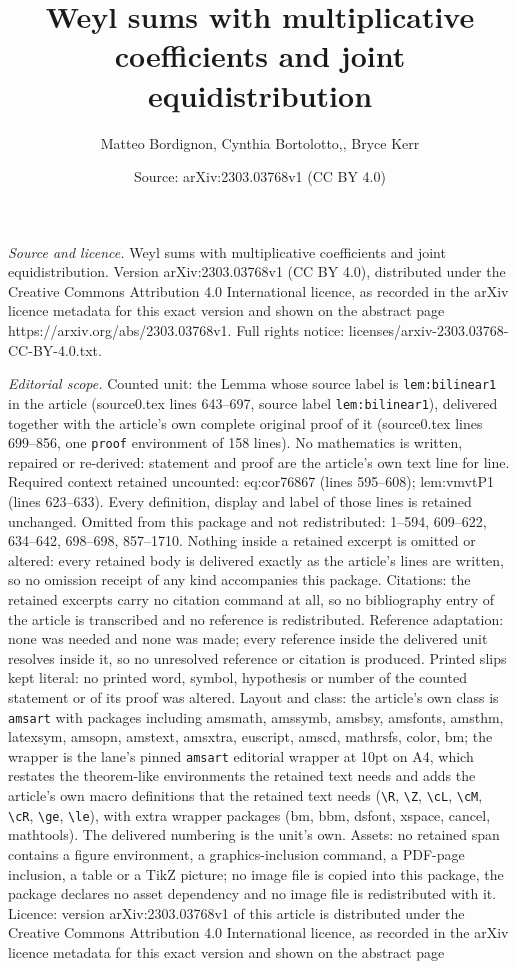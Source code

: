 \documentclass[10pt,a4paper]{amsart}
\title[Weyl sums with multiplicative coefficients and joint equidis]{Weyl sums with multiplicative coefficients and joint equidistribution}
\author{Matteo Bordignon, Cynthia Bortolotto,, Bryce Kerr}
\date{Source: arXiv:2303.03768v1 (CC BY 4.0)}
\begin{document}
\maketitle

\noindent\emph{Source and licence.} Weyl sums with multiplicative coefficients and joint equidistribution. Version arXiv:2303.03768v1 (CC BY 4.0), distributed under the Creative Commons Attribution 4.0 International licence, as recorded in the arXiv licence metadata for this exact version and shown on the abstract page https://arxiv.org/abs/2303.03768v1. Full rights notice: licenses/arxiv-2303.03768-CC-BY-4.0.txt.\par\smallskip

\noindent\textit{Editorial scope.} Counted unit: the Lemma whose source label is \texttt{lem:bilinear1} in the article (source0.tex lines 643--697, source label \texttt{lem:bilinear1}), delivered together with the article's own complete original proof of it (source0.tex lines 699--856, one \texttt{proof} environment of 158 lines). No mathematics is written, repaired or re-derived: statement and proof are the article's own text line for line. Required context retained uncounted: eq:cor76867 (lines 595--608); lem:vmvtP1 (lines 623--633). Every definition, display and label of those lines is retained unchanged. Omitted from this package and not redistributed: 1--594, 609--622, 634--642, 698--698, 857--1710. Nothing inside a retained excerpt is omitted or altered: every retained body is delivered exactly as the article's lines are written, so no omission receipt of any kind accompanies this package. Citations: the retained excerpts carry no citation command at all, so no bibliography entry of the article is transcribed and no reference is redistributed. Reference adaptation: none was needed and none was made; every reference inside the delivered unit resolves inside it, so no unresolved reference or citation is produced. Printed slips kept literal: no printed word, symbol, hypothesis or number of the counted statement or of its proof was altered. Layout and class: the article's own class is \texttt{amsart} with packages including amsmath, amssymb, amsbsy, amsfonts, amsthm, latexsym, amsopn, amstext, amsxtra, euscript, amscd, mathrsfs, color, bm; the wrapper is the lane's pinned \texttt{amsart} editorial wrapper at 10pt on A4, which restates the theorem-like environments the retained text needs and adds the article's own macro definitions that the retained text needs (\texttt{\textbackslash R}, \texttt{\textbackslash Z}, \texttt{\textbackslash cL}, \texttt{\textbackslash cM}, \texttt{\textbackslash cR}, \texttt{\textbackslash ge}, \texttt{\textbackslash le}), with extra wrapper packages (bm, bbm, dsfont, xspace, cancel, mathtools). The delivered numbering is the unit's own. Assets: no retained span contains a figure environment, a graphics-inclusion command, a PDF-page inclusion, a table or a TikZ picture; no image file is copied into this package, the package declares no asset dependency and no image file is redistributed with it. Licence: version arXiv:2303.03768v1 of this article is distributed under the Creative Commons Attribution 4.0 International licence, as recorded in the arXiv licence metadata for this exact version and shown on the abstract page 
\end{document}
